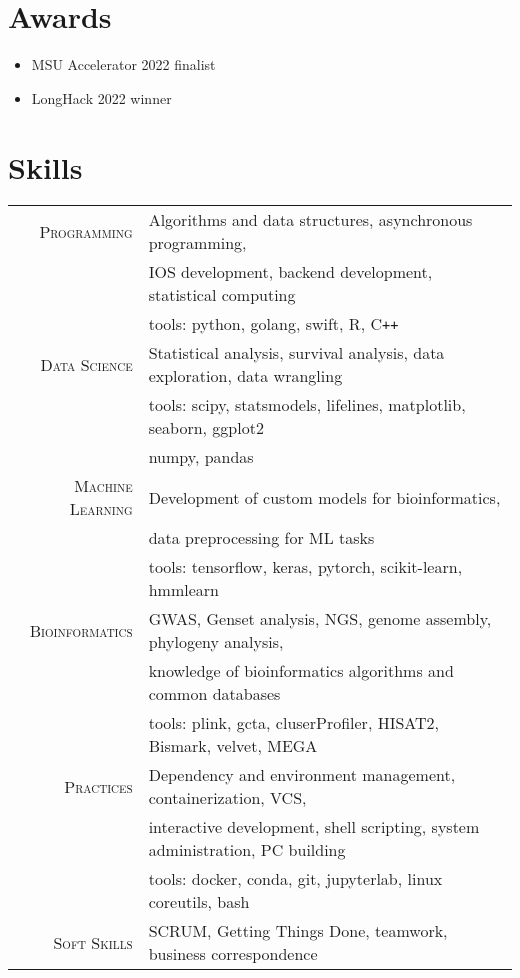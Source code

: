 \section{Awards}
\begin{itemize}
\item MSU Accelerator 2022 finalist
\item LongHack 2022 winner
\end{itemize}



\section{Skills}
\begin{tabular}{rl}

\textsc{Programming}  &  Algorithms and data structures, asynchronous programming,\normalsize\\
\textsc{}  & IOS development, backend development, statistical computing \normalsize\\
\textsc{}  & \footnotesize tools: python, golang, swift, R, C\texttt{++} \normalsize\\

\textsc{Data Science}  &  Statistical analysis, survival analysis,  data exploration, data wrangling\normalsize\\
\textsc{}  & \footnotesize tools: scipy, statsmodels, lifelines, matplotlib, seaborn, ggplot2 \normalsize\\
\textsc{}  & \footnotesize numpy, pandas \normalsize\\

\textsc{Machine Learning}  &  Development of custom models for bioinformatics,\normalsize\\
\textsc{}  &  data preprocessing for ML tasks\normalsize\\
\textsc{}  & \footnotesize tools: tensorflow, keras, pytorch, scikit-learn, hmmlearn \normalsize\\

\textsc{Bioinformatics} & GWAS, Genset analysis, NGS, genome assembly, phylogeny analysis,\normalsize\\
\textsc{}  &  knowledge of bioinformatics algorithms and common databases \normalsize\\
\textsc{}  & \footnotesize tools: plink, gcta, cluserProfiler, HISAT2, Bismark, velvet, MEGA \normalsize\\

\textsc{Practices}  &  Dependency and environment management, containerization, VCS,\normalsize\\
\textsc{}  & interactive development, shell scripting, system administration, PC building\normalsize\\
\textsc{}  & \footnotesize tools: docker, conda, git, jupyterlab, linux coreutils, bash \normalsize\\

\textsc{Soft Skills}  &  SCRUM, Getting Things Done, teamwork, business correspondence \normalsize\\

\end{tabular}

